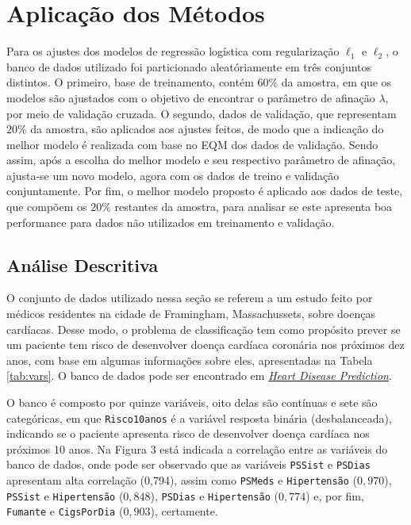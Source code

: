 \documentclass[
  12pt,
]{article}
\begin{document}
\section{Aplicação dos Métodos}

\quad Para os ajustes dos modelos de regressão logística com
regularização \(\ell_1\) e \(\ell_2\), o banco de dados utilizado foi
particionado aleatóriamente em três conjuntos distintos. O primeiro,
base de treinamento, contém \(60\%\) da amostra, em que os modelos são
ajustados com o objetivo de encontrar o parâmetro de afinação
\(\lambda\), por meio de validação cruzada. O segundo, dados de
validação, que representam \(20\%\) da amostra, são aplicados aos
ajustes feitos, de modo que a indicação do melhor modelo é realizada com
base no EQM dos dados de validação. Sendo assim, após a escolha do
melhor modelo e seu respectivo parâmetro de afinação, ajusta-se um novo
modelo, agora com os dados de treino e validação conjuntamente. Por fim,
o melhor modelo proposto é aplicado aos dados de teste, que compõem os
\(20\%\) restantes da amostra, para analisar se este apresenta boa
performance para dados não utilizados em treinamento e validação.

\newpage

\subsection{Análise Descritiva}

\quad O conjunto de dados utilizado nessa seção se referem a um estudo
feito por médicos residentes na cidade de Framingham, Massachussets,
sobre doenças cardíacas. Desse modo, o problema de classificação tem
como propósito prever se um paciente tem risco de desenvolver doença
cardíaca coronária nos próximos dez anos, com base em algumas
informações sobre eles, apresentadas na Tabela \ref{tab:vars}. O banco
de dados pode ser encontrado em
\href{https://www.kaggle.com/naveengowda16/logistic-regression-heart-disease-prediction}{\textit{Heart Disease Prediction}}.

\quad O banco é composto por quinze variáveis, oito delas são contínuas
e sete são categóricas, em que \texttt{Risco10anos} é a variável
resposta binária (desbalanceada), indicando se o paciente apresenta
risco de desenvolver doença cardíaca nos próximos 10 anos. Na Figura 3
está indicada a correlação entre as variáveis do banco de dados, onde
pode ser observado que as variáveis \texttt{PSSist} e \texttt{PSDias}
apresentam alta correlação (0,794), assim como \texttt{PSMeds} e
\texttt{Hipertensão} (\(0,970\)), \texttt{PSSist} e \texttt{Hipertensão}
(\(0,848\)), \texttt{PSDias} e \texttt{Hipertensão} (\(0,774\)) e, por
fim, \texttt{Fumante} e \texttt{CigsPorDia} (\(0,903\)), certamente.
\end{document}
